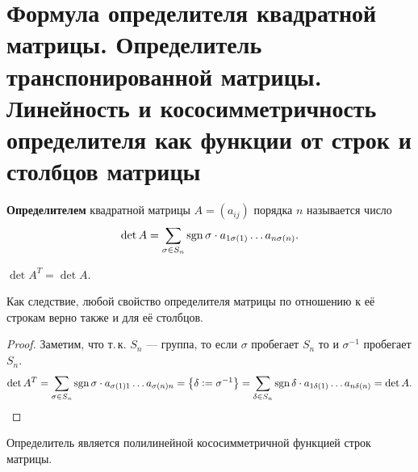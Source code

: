 \section{Формула определителя квадратной матрицы. Определитель транспонированной матрицы. Линейность и кососимметричность определителя как функции от строк и столбцов матрицы}

\begin{definition}
    \textbf{Определителем} квадратной матрицы $A = (a_{ij})$ порядка $n$ называется число
    $$
    \det A = \sum_{\sigma \in S_n} \mathrm{sgn}\,\sigma \cdot a_{1\sigma(1)}\ldots a_{n\sigma(n)}.
    $$
\end{definition}

\begin{theorem}
    $\det A^T = \det A$.
\end{theorem}

\begin{remark}
    Как следствие, любой свойство определителя матрицы по отношению к её строкам верно также и для её столбцов.
\end{remark}

\begin{proof}
    Заметим, что т.\,к. $S_n$ --- группа, то если $\sigma$ пробегает $S_n$ то и $\sigma^{-1}$ пробегает $S_n$.
    $$
    \det A^T = \sum_{\sigma \in S_n} \mathrm{sgn}\,\sigma \cdot a_{\sigma(1)1}\ldots a_{\sigma(n)n} = \big\{\delta \vcentcolon= \sigma^{-1}\big\} = \sum_{\delta \in S_n} \mathrm{sgn}\,\delta \cdot a_{1\delta(1)} \ldots a_{n\delta(n)} = \det A.
    $$
\end{proof}

\begin{theorem}
    Определитель является полилинейной кососимметричной функцией строк матрицы.
\end{theorem}

